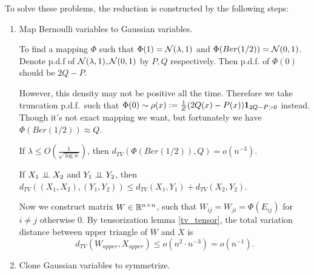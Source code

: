 To solve these problems, the reduction is constructed by the following steps:
\begin{enumerate}
    \item Map Bernoulli variables to Gaussian variables.
    
        To find a mapping $\Phi$ such that $\Phi(1)=\mathcal{N}(\lambda,1)$ and $\Phi(Ber(1/2))=\mathcal{N}(0,1)$. 
        Denote p.d.f of $\mathcal{N}(\lambda,1),\mathcal{N}(0,1)$ by $P,Q$ respectively. Then p.d.f. of $\Phi(0)$ should be $2Q-P$.

        However, this density may not be positive all the time. Therefore we take truncation p.d.f.\ such that $\Phi(0)\sim\rho(x):=\frac{1}{Z}(2Q(x)-P(x))\mathbf{1}_{2Q-P>0}$ instead.
        Though it's not exact mapping we want, but fortunately we have $\Phi(Ber(1/2))\approx Q$.
        \begin{lem}
            \label{ber_to_gau_trunc_approx}
            If $\lambda\le O(\frac{1}{\sqrt{\log n}})$, then $d_{TV}(\Phi(Ber(1/2)),Q)=o(n^{-3})$.
        \end{lem}
        \begin{lem}
            \label{tv_tensor}
            If $X_1\perp \!\!\! \perp X_2$ and $Y_1\perp \!\!\! \perp Y_2$, then $d_{TV}((X_1,X_2),(Y_1,Y_2))\le d_{TV}(X_1,Y_1)+d_{TV}(X_2,Y_2)$.
        \end{lem}
        Now we construct matrix $W\in\mathbb{R}^{n\times n}$, such that $W_{ij}=W_{ji}=\Phi(E_{ij})$ for $i\neq j$ otherwise $0$.
        By tensorization lemma \ref{tv_tensor}, the total variation distance between upper triangle of $W$ and $X$ is
        \[d_{TV}(W_{upper},X_{upper})\le o(n^2\cdot n^{-3})=o(n^{-1}).\]

    \item Clone Gaussian variables to symmetrize.
        

\end{enumerate}
